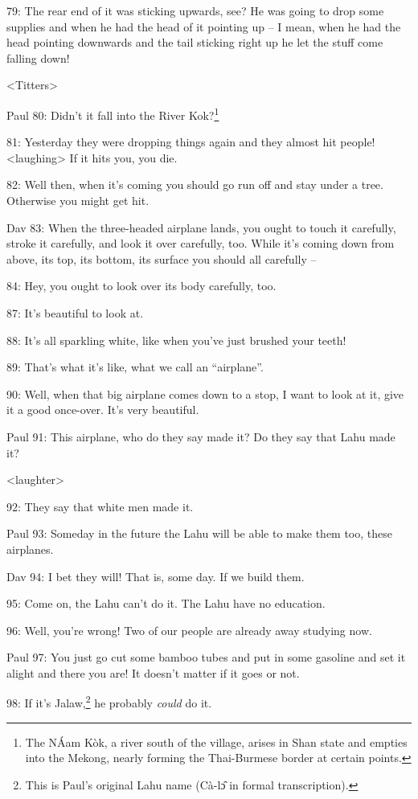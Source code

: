 79: The rear end of it was sticking upwards, see? He was going to drop some supplies
and when he had the head of it pointing up -- I mean, when he had the head pointing
downwards and the tail sticking right up he let the stuff come falling down!

<Titters>

Paul 80: Didn't it fall into the River Kok?\footnote{The NÁam Kòk, a river south of the village, arises in Shan state and empties into the Mekong, nearly forming the Thai-Burmese border at certain points.}

81: Yesterday they were dropping things again and they almost hit people! <laughing>
If it hits you, you die.

82: Well then, when it's coming you should go run off and stay under a tree. Otherwise
you might get hit.

Dav 83: When the three-headed airplane lands, you ought to touch it carefully,
stroke it carefully, and look it over carefully, too. While it's coming down from
above, its top, its bottom, its surface you should all carefully --

84: Hey, you ought to look over its body carefully, too.

87: It's beautiful to look at.

88: It's all sparkling white, like when you've just brushed your teeth!

89: That's what it's like, what we call an ``airplane''.

90: Well, when that big airplane comes down to a stop, I want to look at it, give
it a good once-over. It's very beautiful.

Paul 91: This airplane, who do they say made it? Do they say that Lahu made it?

<laughter>

92: They say that white men made it.

Paul 93: Someday in the future the Lahu will be able to make them too, these airplanes.

Dav 94: I bet they will! That is, some day. If we build them.

95: Come on, the Lahu can't do it. The Lahu have no education.

96: Well, you're wrong! Two of our people are already away studying now.

Paul 97: You just go cut some bamboo tubes and put in some gasoline and set it
alight and there you are! It doesn't matter if it goes or not.

98: If it's Jalaw,\footnote{This is Paul's original Lahu name (Cà-lɔ̂ in formal transcription).} he probably \textit{could} do it.

